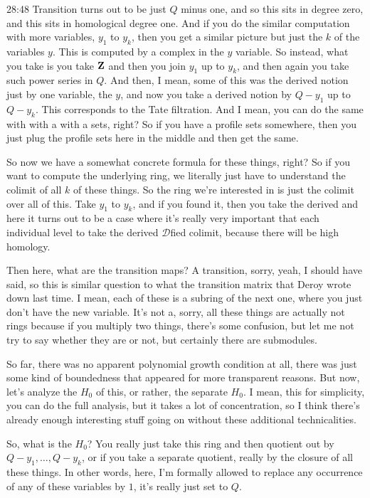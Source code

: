 \begin{unfinished}{28:48}
Transition turns out to be just $Q$ minus one, and so this sits in degree zero, and this sits in homological degree one. And if you do the similar computation with more variables, $y_1$ to $y_k$, then you get a similar picture but just the $k$ of the variables $y$. This is computed by a complex in the $y$ variable. So instead, what you take is you take $\mathbf Z$ and then you join $y_1$ up to $y_k$, and then again you take such power series in $Q$. And then, I mean, some of this was the derived notion just by one variable, the $y$, and now you take a derived notion by $Q - y_1$ up to $Q - y_k$. This corresponds to the Tate filtration. And I mean, you can do the same with with a with a sets, right? So if you have a profile sets somewhere, then you just plug the profile sets here in the middle and then get the same.

So now we have a somewhat concrete formula for these things, right? So if you want to compute the underlying ring, we literally just have to understand the colimit of all $k$ of these things. So the ring we're interested in is just the colimit over all of this. Take $y_1$ to $y_k$, and if you found it, then you take the derived and here it turns out to be a case where it's really very important that each individual level to take the derived $\mathcal{D}$fied colimit, because there will be high homology.

Then here, what are the transition maps? A transition, sorry, yeah, I should have said, so this is similar question to what the transition matrix that Deroy wrote down last time. I mean, each of these is a subring of the next one, where you just don't have the new variable. It's not a, sorry, all these things are actually not rings because if you multiply two things, there's some confusion, but let me not try to say whether they are or not, but certainly there are submodules.

So far, there was no apparent polynomial growth condition at all, there was just some kind of boundedness that appeared for more transparent reasons. But now, let's analyze the $H_0$ of this, or rather, the separate $H_0$. I mean, this for simplicity, you can do the full analysis, but it takes a lot of concentration, so I think there's already enough interesting stuff going on without these additional technicalities.

So, what is the $H_0$? You really just take this ring and then quotient out by $Q - y_1, \dots, Q - y_k$, or if you take a separate quotient, really by the closure of all these things. In other words, here, I'm formally allowed to replace any occurrence of any of these variables by $1$, it's really just set to $Q$.


\end{unfinished}
